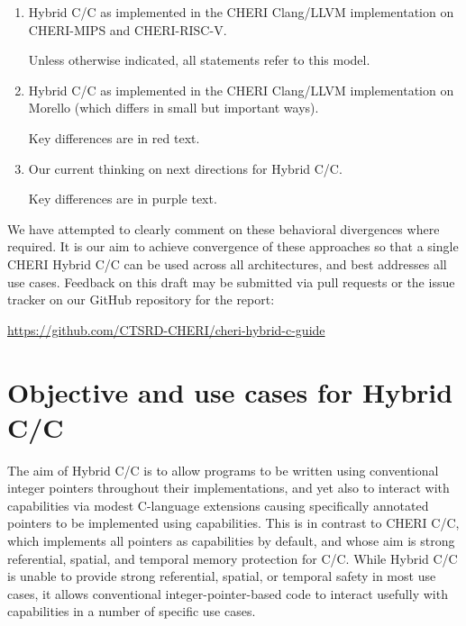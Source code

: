 \documentclass[12pt,twoside,openright,a4paper]{article}
\newcommand{\futurevariant}[1]{{\color{purple} #1}}
\newcommand{\morellovariant}[1]{{\color{red} #1}}
\newcommand{\note}[2]{{\color{blue}[ Note: #1 - #2]}}
\renewcommand{\note}[2]{\relax\ifhmode\unskip\fi}
\newcommand{\psnote}[1]{\note{#1}{Peter S.}}
\newcommand*{\cpp}{\texorpdfstring{C\textsmaller[2]{\protect\nolinebreak[4]\hspace{-.05em}\raisebox{.45ex}{\textbf{++}}}}{C++}}
\newcommand*{\COrCpp}{C/\cpp{}}
\newcommand*{\purecapCOrCpp}{CHERI \COrCpp{}}
\newcommand*{\CHERIhybridCOrCpp}{CHERI Hybrid \COrCpp{}}
\newcommand*{\hybridCOrCpp}{Hybrid \COrCpp{}}
\begin{document}
\begin{enumerate}
\item \hybridCOrCpp{} as implemented in the CHERI Clang/LLVM implementation on
  CHERI-MIPS and CHERI-RISC-V.

  Unless otherwise indicated, all statements refer to this model.

\item \hybridCOrCpp{} as implemented in the CHERI Clang/LLVM implementation on
  Morello (which differs in small but important ways).

  Key differences are in \morellovariant{red text}.

\item Our current thinking on next directions for \hybridCOrCpp{}.

  Key differences are in \futurevariant{purple text}.
\end{enumerate}

\noindent
We have attempted to clearly comment on these behavioral divergences where
required.
It is our aim to achieve convergence of these approaches so that a single
\CHERIhybridCOrCpp{} can be used across all architectures, and best addresses
all use cases.
Feedback on this draft may be submitted via pull requests or the issue tracker
on our GitHub repository for the report:

\smallskip

\url{https://github.com/CTSRD-CHERI/cheri-hybrid-c-guide}

\section{Objective and use cases for \hybridCOrCpp{}}

\psnote{somewhere early on, maybe here, this document should be saying what code has been ported to (or implemented from scratch) in Hybrid}

The aim of \hybridCOrCpp{} is to allow programs to be written using
conventional integer pointers throughout their implementations, and yet also
to interact with capabilities via modest C-language extensions causing
specifically annotated pointers to be implemented using capabilities.
This is in contrast to \purecapCOrCpp{}, which implements all pointers as
capabilities by default, and whose aim is strong referential, spatial, and
temporal memory protection for C/\cpp{}.
\psnote{including ``temporal'' there, unqualified, is going to be confusing.  Suggest splitting the sentence up and describing more explicitly what the current state and plausible options are w.r.t. temporal}
While \hybridCOrCpp{} is unable to provide strong referential, spatial, or
temporal safety in most use cases, it allows conventional
integer-pointer-based code to interact usefully with capabilities in a number
of specific use cases.
\psnote{that seems to underplay what one can get from hybrid -- surely one can say something about ``specific protections'' or ``protection in specific ways'' or something?}
\end{document}
